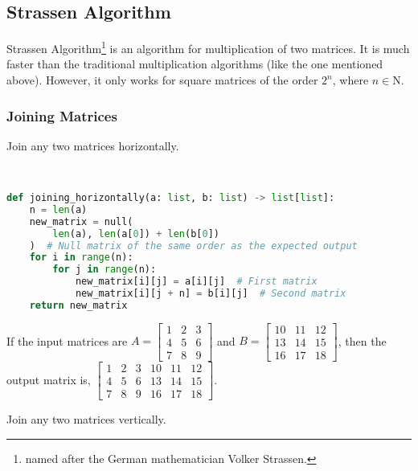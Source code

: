 \subsection{Strassen Algorithm}
Strassen Algorithm\footnote{named after the German mathematician Volker Strassen.} is an algorithm for multiplication of two matrices. It is much faster than the traditional multiplication algorithms (like the one mentioned above). However, it only works for square matrices of the order $2^n$, where $n\in \mathrm{N}$.
\subsubsection{Joining Matrices}
\begin{eg}
	Join any two matrices horizontally.
\end{eg}
\begin{explanation}
	\phantom \\
	\begin{lstlisting}[language=Python, numbers=none]
def joining_horizontally(a: list, b: list) -> list[list]:
	n = len(a)
	new_matrix = null(
		len(a), len(a[0]) + len(b[0])
	)  # Null matrix of the same order as the expected output
	for i in range(n):
		for j in range(n):  
			new_matrix[i][j] = a[i][j]  # First matrix
			new_matrix[i][j + n] = b[i][j]  # Second matrix
	return new_matrix \end{lstlisting}
	If the input matrices are $A=\begin{bmatrix}
			1 & 2 & 3 \\
			4 & 5 & 6 \\
			7 & 8 & 9
		\end{bmatrix}$ and $B=\begin{bmatrix}
			10 & 11 & 12 \\
			13 & 14 & 15 \\
			16 & 17 & 18
		\end{bmatrix}$, then the output matrix is, $\begin{bmatrix}
			1 & 2 & 3 & 10 & 11 & 12 \\
			4 & 5 & 6 & 13 & 14 & 15 \\
			7 & 8 & 9 & 16 & 17 & 18
		\end{bmatrix}$.
\end{explanation}
\begin{eg}
	Join any two matrices vertically.
\end{eg}

